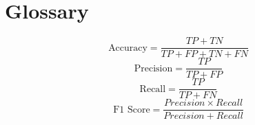 \documentclass{assignmeownt}
\begin{document}
\section{Glossary}
$$\text{Accuracy} = \frac{TP+TN}{TP+FP+TN+FN}$$
$$\text{Precision} = \frac{TP}{TP+FP}$$
$$\text{Recall} = \frac{TP}{TP+FN}$$
$$\text{F1 Score} = \frac{Precision\times Recall}{Precision+Recall}$$

\end{document}
